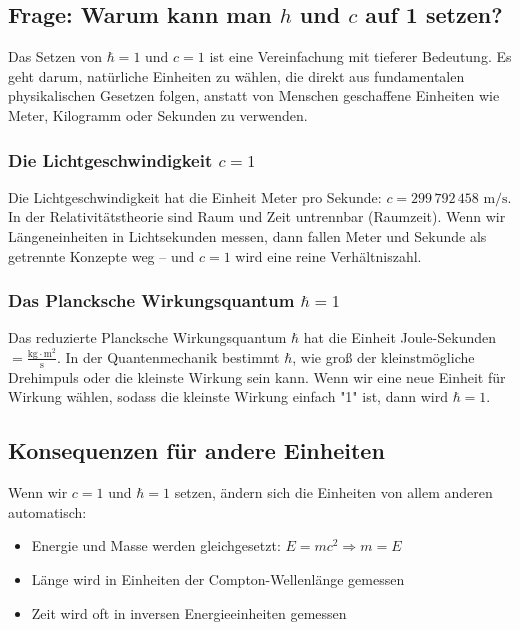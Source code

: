 \documentclass{article}
\begin{document}
	\subsection{Frage: Warum kann man $h$ und $c$ auf 1 setzen?}
	
	Das Setzen von $\hbar = 1$ und $c = 1$ ist eine Vereinfachung mit tieferer Bedeutung. Es geht darum, natürliche Einheiten zu wählen, die direkt aus fundamentalen physikalischen Gesetzen folgen, anstatt von Menschen geschaffene Einheiten wie Meter, Kilogramm oder Sekunden zu verwenden.
	
	\subsubsection{Die Lichtgeschwindigkeit $c = 1$}
	Die Lichtgeschwindigkeit hat die Einheit Meter pro Sekunde: $c = 299\,792\,458 \text{ m/s}$. In der Relativitätstheorie sind Raum und Zeit untrennbar (Raumzeit). Wenn wir Längeneinheiten in Lichtsekunden messen, dann fallen Meter und Sekunde als getrennte Konzepte weg – und $c = 1$ wird eine reine Verhältniszahl.
	
	\subsubsection{Das Plancksche Wirkungsquantum $\hbar = 1$}
	Das reduzierte Plancksche Wirkungsquantum $\hbar$ hat die Einheit Joule-Sekunden $= \frac{\text{kg} \cdot \text{m}^2}{\text{s}}$. In der Quantenmechanik bestimmt $\hbar$, wie groß der kleinstmögliche Drehimpuls oder die kleinste Wirkung sein kann. Wenn wir eine neue Einheit für Wirkung wählen, sodass die kleinste Wirkung einfach "1" ist, dann wird $\hbar = 1$.
	
	\subsection{Konsequenzen für andere Einheiten}
	Wenn wir $c = 1$ und $\hbar = 1$ setzen, ändern sich die Einheiten von allem anderen automatisch:
	
	\begin{itemize}
		\item Energie und Masse werden gleichgesetzt: $E = mc^2 \Rightarrow m = E$
		\item Länge wird in Einheiten der Compton-Wellenlänge gemessen
		\item Zeit wird oft in inversen Energieeinheiten gemessen
	\end{itemize}
	
\end{document}

